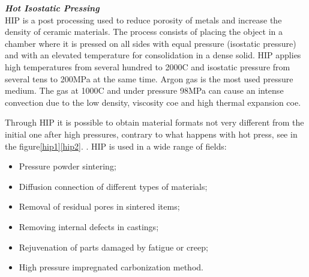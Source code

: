 \vspace{20}
 \textbf{\emph{Hot Isostatic Pressing}}\\


\ac{HIP} is a post processing used to reduce porosity of metals and increase the density of ceramic materials.
The process consists of placing the object in a chamber where it is pressed on all sides with equal pressure (isostatic pressure) and with an elevated temperature for consolidation in a dense solid\cite{atkinson2000fundamental}. \ac{HIP} applies high temperatures from several hundred to 2000\degree C and isostatic pressure from several tens to 200MPa at the same time. Argon gas is the most used pressure medium. The gas at 1000\degree C and under pressure 98MPa can cause an intense convection due to the low density, viscosity coe and high thermal expansion coe\cite{HIP}.\par
Through \ac{HIP} it is possible to obtain material formats not very different from the initial one after high pressures, contrary to what happens with hot press, see in the figure\ref{hip1}\ref{hip2}. \cite{atkinson2000fundamental}.
\ac{HIP} is used in a wide range of fields:
\begin{itemize}
    \item Pressure powder sintering;
    \item Diffusion connection of different types of materials;
    \item Removal of residual pores in sintered items;
    \item Removing internal defects in castings;
    \item Rejuvenation of parts damaged by fatigue or creep;
    \item High pressure impregnated carbonization method.
\end{itemize}





